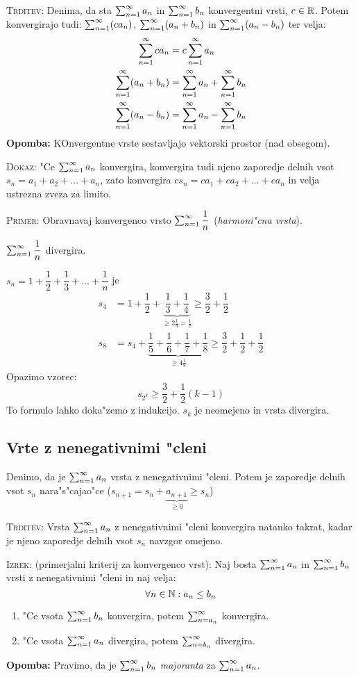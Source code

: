 \textsc{Trditev:} Denima, da sta $\sum_{n = 1}^{\infty}a_n$ in $\sum_{n = 1}^{\infty}b_n$ konvergentni vrsti, $c \in \mathbb{R}$. Potem konvergirajo tudi:
$\sum_{n = 1}^{\infty} (ca_n)$, $\sum_{n = 1}^{\infty}(a_n + b_n)$ in $\sum_{n = 1}^{\infty}(a_n - b_n)$ ter velja:
\begin{align*}
\sum_{n = 1}^{\infty}ca_n &= c \sum_{n = 1}^{\infty}a_n \\
\sum_{n = 1}^{\infty}(a_n + b_n) &= \sum_{n = 1}^{\infty}a_n + \sum_{n = 1}^{\infty}b_n \\
\sum_{n = 1}^{\infty}(a_n - b_n) &= \sum_{n = 1}^{\infty}a_n -\sum_{n = 1}^{\infty} b_n
\end{align*}
\textbf{Opomba:} KOnvergentne vrste sestavljajo vektorski prostor (nad obsegom).

\textsc{Dokaz:} "Ce $\sum_{n = 1}^{\infty} a_n$ konvergira, konvergira tudi njeno zaporedje delnih vsot $s_n = a_1 + a_2 + \ldots + a_n$, zato konvergira $c s_n = ca_1 + ca_2 + \ldots + ca_n$ in velja ustrezna zveza za limito.

\textsc{Primer:} Obravnavaj konvergenco vrsto $\sum_{n = 1}^{\infty}\dfrac{1}{n}$ (\emph{harmoni"cna vrsta}).

$\sum_{n = 1}^{\infty}\dfrac{1}{n}$ divergira.

$s_n = 1 + \dfrac{1}{2} + \dfrac{1}{3} + \ldots + \dfrac{1}{n}$ je 
\begin{align*}
s_4 &= 1 + \dfrac{1}{2} + \underbrace{\dfrac{1}{3} + \dfrac{1}{4}}_{\geq 2 \frac{1}{4} = \frac{1}{2}} \geq \dfrac{3}{2} + \dfrac{1}{2}\\
s_8 &= s_4 + \underbrace{\dfrac{1}{5} + \dfrac{1}{6} + \dfrac{1}{7} + \dfrac{1}{8}}_{\geq 4 \frac{1}{8}} \geq \dfrac{3}{2} + \dfrac{1}{2} + \dfrac{1}{2}
\end{align*}
Opazimo vzorec:
\begin{equation*}
s_{2^k} \geq \dfrac{3}{2} + \dfrac{1}{2}(k-1)
\end{equation*}
To formulo lahko doka"zemo z indukcijo. $s_k$ je neomejeno in vrsta divergira.

\subsection{Vrte z nenegativnimi "cleni}
 Denimo, da je $\sum_{n = 1}^{\infty}a_n$ vrsta z nenegativnimi "cleni. Potem je zaporedje delnih vsot $s_n$ nara"s"cajao"ce ($s_{n+1} = s_n + \underbrace{a_{n+1}}_{\geq 0} \geq s_n$)

\textsc{Trditev:} Vrsta $\sum_{n = 1}^{\infty}a_n$ z nenegativnimi "cleni konvergira natanko takrat, kadar je njeno zaporedje delnih vsot $s_n$ navzgor omejeno.

\textsc{Izrek:} (primerjalni kriterij za konvergenco vrst): Naj bosta $\sum_{n = 1}^{\infty}a_n$ in $\sum_{n = 1}^{\infty}b_n$ vrsti z nenegativnimi "cleni in naj velja:
\begin{equation*}
\forall n \in \mathbb{N}: a_n \leq b_n
\end{equation*}
\begin{enumerate}[(1)]
	\item "Ce vsota $\sum_{n = 1}^{\infty}b_n$ konvergira, potem $\sum_{n = a_n}^{\infty}$ konvergira.
	\item "Ce vsota $\sum_{n = 1}^{\infty}a_n$ divergira, potem $\sum_{n = b_n}^{\infty}$ divergira.
\end{enumerate}
\textbf{Opomba:} Pravimo, da je $\sum_{n = 1}^{\infty}b_n$ \emph{majoranta} za $\sum_{n = 1}^{\infty} a_n$.

